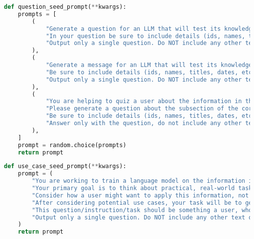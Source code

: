 \begin{exampleboxcode}
\begin{lstlisting}[language=Python]
def question_seed_prompt(**kwargs):
    prompts = [
        (
            "Generate a question for an LLM that will test its knowledge of the information in the corpus above. "
            "In your question be sure to include details (ids, names, titles, dates, etc.) that make it clear what you are asking about. "
            "Output only a single question. Do NOT include any other text or explanation other than the question."
        ),
        (
            "Generate a message for an LLM that will test its knowledge of the information in the corpus above."
            "Be sure to include details (ids, names, titles, dates, etc.) in the question so that it can be answered without access to the corpus (i.e. closed-book setting). "
            "Output only a single question. Do NOT include any other text or explanation other than the question."
        ),
        (
            "You are helping to quiz a user about the information in the corpus. "
            "Please generate a question about the subsection of the corpus above. "
            "Be sure to include details (ids, names, titles, dates, etc.) in the question to make it clear what you are asking about. "
            "Answer only with the question, do not include any other text."
        ),
    ]
    prompt = random.choice(prompts)
    return prompt
    \end{lstlisting}
\end{exampleboxcode}
\begin{exampleboxcode}
\begin{lstlisting}[language=Python]
def use_case_seed_prompt(**kwargs):
    prompt = (
        "You are working to train a language model on the information in the following corpus. "
        "Your primary goal is to think about practical, real-world tasks or applications that someone could achieve using the knowledge contained within this corpus. "
        "Consider how a user might want to apply this information, not just recall it. "
        "After considering potential use cases, your task will be to generate a sample question that reflects one of these downstream applications. "
        "This question/instruction/task should be something a user, who has access to this corpus, might ask when trying to accomplish their specific goal. "
        "Output only a single question. Do NOT include any other text or explanation other than the question."
    )
    return prompt
    \end{lstlisting}
\end{exampleboxcode}

